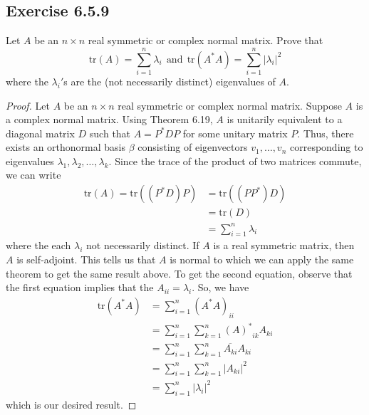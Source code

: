\subsection*{Exercise 6.5.9} Let \( A  \) be an  \( n \times n  \) real symmetric or complex normal matrix. Prove that 
\[  \text{tr}(A) = \sum_{ i=1  }^{ n } {\lambda}_{i} \ \ \text{and} \ \ \text{tr}(A^{*}A) = \sum_{ i=1  }^{ n } | {\lambda}_{i} |^{2} \] 
where the \( {\lambda}_{i}' \)s are the (not necessarily distinct) eigenvalues of \( A  \).
\begin{proof}
    Let \( A  \) be an \( n \times n  \) real symmetric or complex normal matrix. Suppose \( A  \) is a complex normal matrix. Using Theorem 6.19, \( A  \) is unitarily equivalent to a diagonal matrix \( D  \) such that  \( A =P^{*} D P  \) for some unitary matrix \( P  \). Thus, there exists an orthonormal basis \( \beta   \) consisting of eigenvectors \( {v}_{1}, \dots, {v}_{n} \) corresponding to eigenvalues \( {\lambda}_{1}, {\lambda}_{2}, \dots, {\lambda}_{k}   \). Since the trace of the product of two matrices commute, we can write
    \begin{align*}
       \text{tr}(A) = \text{tr}( (P^{*} D) P  )  &= \text{tr}((P P^{*}) D ) \\
                                                 &= \text{tr}(D) \\
                                                 &= \sum_{ i=1  }^{ n } {\lambda}_{i}
    \end{align*}
    where the each \( {\lambda}_{i} \) not necessarily distinct. If \( A  \) is a real symmetric matrix, then \( A  \) is self-adjoint. This tells us that \( A  \) is normal to which we can apply the same theorem to get the same result above. To get the second equation, observe that the first equation implies that the \( {A}_{ii} = {\lambda}_{i} \). So, we have 
    \begin{align*}
        \text{tr}(A^{*}A) &= \sum_{ i=1  }^{ n } {(A^{*}A)}_{ii} \\
                          &= \sum_{ i=1  }^{ n } \sum_{ k=1  }^{ n } {(A)^{*}}_{ik} {A}_{ki} \\ 
                          &= \sum_{ i=1  }^{ n } \sum_{ k=1  }^{ n } \overline{{A}_{ki}} {A}_{ki} \\ 
                          &= \sum_{ i=1  }^{ n  } \sum_{ k=1  }^{ n } | {A}_{ki} |^{2} \\
                          &= \sum_{ i=1  }^{ n  } | {\lambda}_{i} |^{2}
    \end{align*}
    which is our desired result.
\end{proof}

